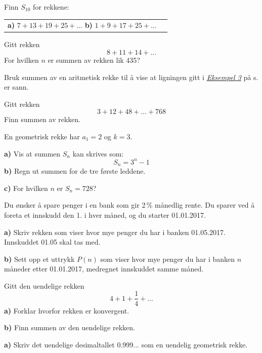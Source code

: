 Finn $ S_{10} $ for rekkene:\os
\begin{tabular}{@{}l l}	
	\textbf{a)} $ 7+13+19+25+\ldots $\quad
	\textbf{b)} $ 1+9+17+25+\ldots $
\end{tabular} \os

Gitt rekken 
\[ 8+11+14+\ldots \]
For hvilken $ n $ er summen av rekken lik 435?

Bruk summen av en aritmetisk rekke til å vise at ligningen gitt i \hyperref[prodind]{\textsl{Eksempel 3}} på s. \pageref{prodind} er sann.

Gitt rekken
\[ 3+12+48+\ldots+768 \]
Finn summen av rekken. 

En geometrisk rekke har $ {a_1 = 2} $ og $ {k=3} $.\os 

\textbf{a)} Vis at summen $ S_n $ kan skrives som:
\[ S_n = 3^n-1 \]
\textbf{b)} Regn ut summen for de tre første leddene.\os

\textbf{c)} For hvilken $ n $ er $ S_n=728 $?

Du ønsker å spare penger i en bank som gir 2\,\% månedlig rente. Du sparer ved å foreta et innskudd den 1. i hver måned, og du starter 01.01.2017.\os

\textbf{a)} Skriv rekken som viser hvor mye penger du har i banken 01.05.2017. Innskuddet 01.05 skal tas med.\os

\textbf{b)} Sett opp et uttrykk $ P(n) $ som viser hvor mye penger du har i banken $ n $ måneder etter 01.01.2017, medregnet innskuddet samme måned.

Gitt den uendelige rekken
\[ 4+1+\frac{1}{4}+\ldots \]
\textbf{a)} Forklar hvorfor rekken er konvergent.\os

\textbf{b)} Finn summen av den uendelige rekken.

\newpage
{}
\textbf{a)} Skriv det uendelige desimaltallet 0.999... som en uendelig geometrisk rekke.\os


